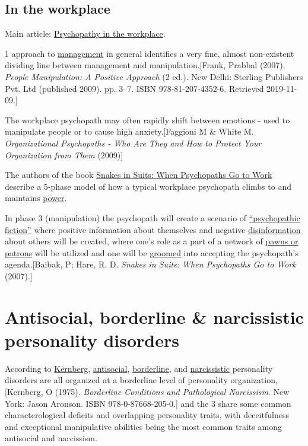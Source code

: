 \documentclass{book}
\numberwithin{equation}{section}
\begin{document}
\subsection{In the workplace}
Main article: \href{https://en.wikipedia.org/wiki/Psychopathy_in_the_workplace}{Psychopathy in the workplace}.

%
1 approach to \href{https://en.wikipedia.org/wiki/Management}{management} in general identifies a very fine, almost non-existent dividing line between management and manipulation.[Frank, Prabbal (2007). \textit{People Manipulation: A Positive Approach} (2 ed.). New Delhi: Sterling Publishers Pvt. Ltd (published 2009). pp. 3--7. ISBN 978-81-207-4352-6. Retrieved 2019-11-09.]

%
The workplace psychopath may often rapidly shift between emotions - used to manipulate people or to cause high anxiety.[Faggioni M \& White M. \textit{Organizational Psychopaths - Who Are They and How to Protect Your Organization from Them} (2009)]

%
The authors of the book \href{https://en.wikipedia.org/wiki/Snakes_in_Suits:_When_Psychopaths_Go_to_Work}{Snakes in Suits: When Psychopaths Go to Work} describe a 5-phase model of how a typical workplace psychopath climbs to and maintains \href{https://en.wikipedia.org/wiki/Power_(social_and_political)}{power}.

In phase 3 (manipulation) the psychopath will create a scenario of \href{https://en.wikipedia.org/wiki/Cognitive_distortion}{``psychopathic fiction''} where positive information about themselves and negative \href{https://en.wikipedia.org/wiki/Disinformation}{disinformation} about others will be created, where one's role as a part of a network of \href{https://en.wikipedia.org/wiki/Flying_monkeys_(psychology)}{pawns or patrons} will be utilized and one will be \href{https://en.wikipedia.org/wiki/Operant_conditioning}{groomed} into accepting the psychopath's agenda.[Baibak, P; Hare, R. D. \textit{Snakes in Suits: When Psychopaths Go to Work} (2007).]

\section{Antisocial, borderline \& narcissistic personality disorders}
According to \href{https://en.wikipedia.org/wiki/Otto_Kernberg}{Kernberg}, \href{https://en.wikipedia.org/wiki/Antisocial_Personality_Disorder}{antisocial}, \href{https://en.wikipedia.org/wiki/Borderline_Personality_Disorder}{borderline}, and \href{https://en.wikipedia.org/wiki/Narcissistic_Personality_Disorder}{narcissistic} personality disorders are all organized at a borderline level of personality organization,[Kernberg, O (1975). \textit{Borderline Conditions and Pathological Narcissism}. New York: Jason Aronson. ISBN 978-0-87668-205-0.] and the 3 share some common characterological deficits and overlapping personality traits, with deceitfulness and exceptional manipulative abilities being the most common traits among antisocial and narcissism.
\end{document}

